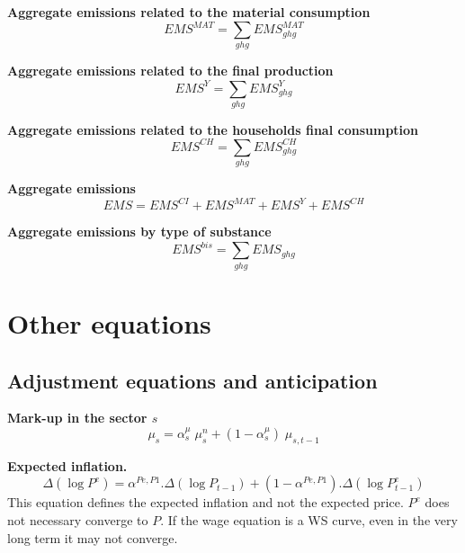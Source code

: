 \documentclass[12pt]{article}
\numberwithin{equation}{section}
\begin{document}
\noindent\textbf{Aggregate emissions related to the material consumption} \\
\begin{dmath}
EMS^{MAT} = \sum_{ghg} EMS^{MAT}_{ghg}
\end{dmath}

\noindent\textbf{Aggregate emissions related to the final production} \\
\begin{dmath}
EMS^{Y} = \sum_{ghg} EMS^{Y}_{ghg}
\end{dmath}

\noindent\textbf{Aggregate emissions related to the households final consumption} \\
\begin{dmath}
EMS^{CH} = \sum_{ghg} EMS^{CH}_{ghg}
\end{dmath}

\noindent\textbf{Aggregate emissions} \\
\begin{dmath}
EMS = EMS^{CI} + EMS^{MAT} + EMS^{Y} + EMS^{CH}
\end{dmath}

\noindent\textbf{Aggregate emissions by type of substance} \\
\begin{dmath}
EMS^{bis} = \sum_{ghg} EMS_{ghg}
\end{dmath}


\section{Other equations}





\subsection{Adjustment equations and anticipation}



\noindent\textbf{Mark-up in the sector $s$} \\
\begin{dmath}
\mu_{s} = \alpha^{\mu}_{s} \; \mu^{n}_{s} + \left( 1 - \alpha^{\mu}_{s} \right) \; \mu_{s, t-1}
\end{dmath}

\noindent\textbf{Expected inflation.} \\
\begin{dmath}
\varDelta \left(\operatorname{log} P^{e}\right) = \alpha^{Pe,P1} . \varDelta \left(\operatorname{log} P_{t-1}\right) + \left( 1 - \alpha^{Pe,P1} \right) . \varDelta \left(\operatorname{log} P^{e}_{t-1}\right)
\end{dmath}
This equation defines the expected inflation and not the expected price. $P^{e}$ does not necessary converge to $P$. If the wage equation is a WS curve, even in the very long term it may not converge. \\
\end{document}
